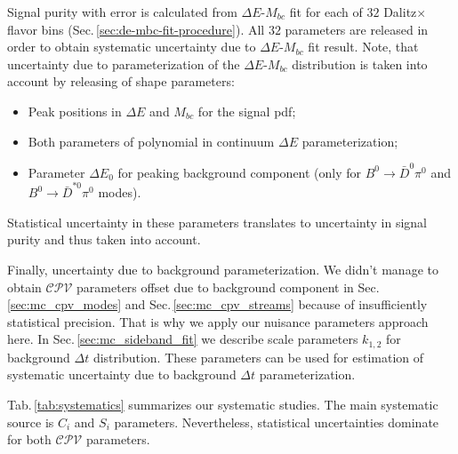 \documentclass[preprint,aps,showpacs]{revtex4}
\newcommand{\dt}{\ensuremath{\Delta t}\xspace}
\newcommand{\cpvconj}{\ensuremath{\mathcal{CPV}}\xspace}
\newcommand{\bdpi}{\ensuremath{B^0\to \bar D^0\pi^0}\xspace}
\newcommand{\btodstpi}{\ensuremath{B^0\to \bar D^{*0}\pi^0}\xspace}
\newcommand{\de}{\ensuremath{\Delta E}\xspace}
\newcommand{\mbc}{\ensuremath{M_{bc}}\xspace}
\begin{document}
Signal purity with error is calculated from \de-\mbc fit for each of $32$ Dalitz$\times$flavor bins (Sec.\,\ref{sec:de-mbc-fit-procedure}). All $32$ parameters are released in order to obtain systematic uncertainty due to \de-\mbc fit result. Note, that uncertainty due to parameterization of the \de-\mbc distribution is taken into account by releasing of shape parameters:
\begin{itemize}
 \item Peak positions in \de and \mbc for the signal pdf;
 \item Both parameters of polynomial in continuum \de parameterization;
 \item Parameter $\de_0$ for peaking background component (only for \bdpi and \btodstpi modes).
\end{itemize}
Statistical uncertainty in these parameters translates to uncertainty in signal purity and thus taken into account.

Finally, uncertainty due to background parameterization. We didn't manage to obtain \cpvconj parameters offset due to background component in Sec.\,\ref{sec:mc_cpv_modes} and Sec.\,\ref{sec:mc_cpv_streams} because of insufficiently statistical precision. That is why we apply our nuisance parameters approach here. In Sec.\,\ref{sec:mc_sideband_fit} we describe scale parameters $k_{1,2}$ for background \dt distribution. These parameters can be used for estimation of systematic uncertainty due to background \dt parameterization.

Tab.\,\ref{tab:systematics} summarizes our systematic studies. The main systematic source is $C_i$ and $S_i$ parameters. Nevertheless, statistical uncertainties dominate for both \cpvconj parameters.
\end{document}
